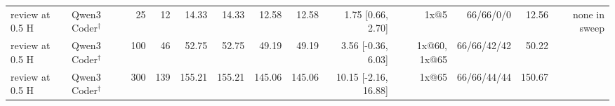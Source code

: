 \begin{table}[t]
\begin{tabular}{llrrrrrrrrrrr}
review at 0.5 H & Qwen3 Coder$^\dagger$ & 25 & 12 & 14.33 & 14.33 & 12.58 & 12.58 & 1.75 [0.66, 2.70] & 1x@5 & 66/66/0/0 & 12.56 & none in sweep \\
review at 0.5 H & Qwen3 Coder$^\dagger$ & 100 & 46 & 52.75 & 52.75 & 49.19 & 49.19 & 3.56 [-0.36, 6.03] & 1x@60, 1x@65 & 66/66/42/42 & 50.22 &  \\
review at 0.5 H & Qwen3 Coder$^\dagger$ & 300 & 139 & 155.21 & 155.21 & 145.06 & 145.06 & 10.15 [-2.16, 16.88] & 1x@65 & 66/66/44/44 & 150.67 &  \\
\bottomrule
\end{tabular}
\end{table}
